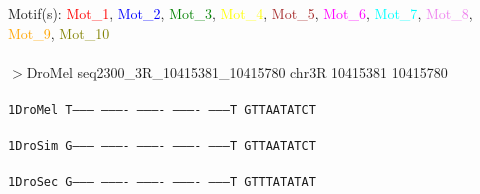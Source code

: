 \documentclass[11pt,twoside,reqno,a4paper]{article}
\begin{document}
\noindent
\newlength{\charwidth}Motif(s): \textcolor{red}{Mot\_1}, \textcolor{blue}{Mot\_2}, \textcolor{green}{Mot\_3}, \textcolor{yellow}{Mot\_4}, \textcolor{brown}{Mot\_5}, \textcolor{magenta}{Mot\_6}, \textcolor{cyan}{Mot\_7}, \textcolor{violet}{Mot\_8}, \textcolor{orange}{Mot\_9}, \textcolor{olive}{Mot\_10}\\
\\
$>$DroMel	seq2300\_3R\_10415381\_10415780	chr3R	10415381	10415780 \\
 \\
\texttt{1\hspace*{3\charwidth}DroMel	T---------	----------	----------	----------	---------T	GTTAATATCT	\\
\hspace*{4\charwidth}\hspace*{7\charwidth}\hspace*{1\charwidth}\hspace*{1\charwidth}\hspace*{1\charwidth}\hspace*{1\charwidth}\hspace*{1\charwidth}\hspace*{1\charwidth}\\
1\hspace*{3\charwidth}DroSim	G---------	----------	----------	----------	---------T	GTTAATATCT	\\
\hspace*{4\charwidth}\hspace*{7\charwidth}\hspace*{1\charwidth}\hspace*{1\charwidth}\hspace*{1\charwidth}\hspace*{1\charwidth}\hspace*{1\charwidth}\hspace*{1\charwidth}\\
1\hspace*{3\charwidth}DroSec	G---------	----------	----------	----------	---------T	GTTTATATAT	\\
\hspace*{4\charwidth}\hspace*{7\charwidth}\hspace*{1\charwidth}\hspace*{1\charwidth}\hspace*{1\charwidth}\hspace*{1\charwidth}\hspace*{1\charwidth}\hspace*{1\charwidth}\\
}
\end{document}
